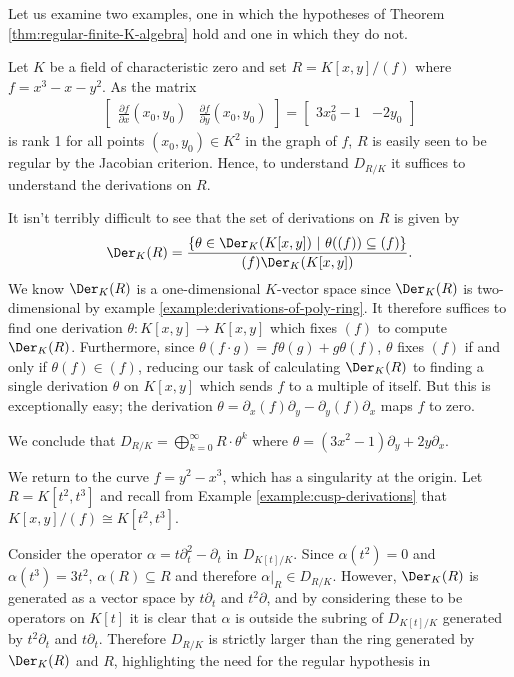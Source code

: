 Let us examine two examples, one in which the hypotheses of Theorem \ref{thm:regular-finite-K-algebra} hold and one in which they do not.
\begin{example}\label{example:elliptic-curve}
	Let $K$ be a field of characteristic zero and set $R = K[x,y]/(f)$ where $f = x^3 - x - y^2$. As the matrix
	\begin{align*}
		\begin{bmatrix}
			\frac{\partial f}{\partial x}(x_0,y_0) & \frac{\partial f}{\partial y}(x_0, y_0)
		\end{bmatrix}
		=
		\begin{bmatrix}
			3x_0^2 - 1 & -2y_0
		\end{bmatrix}
	\end{align*}
	is rank 1 for all points $(x_0,y_0)\in K^2$ in the graph of $f$, $R$ is easily seen to be regular by the Jacobian criterion. Hence, to understand $D_{R/K}$ it suffices to understand the derivations on $R$.

	It isn't terribly difficult to see that the set of derivations on $R$ is given by
	\begin{align*}
		\Der_K(R) = \frac{\{\theta \in \Der_K(K[x,y])~|~ \theta((f)) \subseteq (f)\}}{(f)\Der_K(K[x,y])}.
	\end{align*}
	We know $\Der_K(R)$ is a one-dimensional $K$-vector space since $\Der_K(R)$ is two-dimensional by example \ref{example:derivations-of-poly-ring}. It therefore suffices to find one derivation $\theta:K[x,y] \to K[x,y]$ which fixes $(f)$ to compute $\Der_K(R)$. Furthermore, since $\theta(f\cdot g) = f\theta(g) + g\theta(f)$, $\theta$ fixes $(f)$ if and only if $\theta(f) \in (f)$, reducing our task of calculating $\Der_K(R)$ to finding a single derivation $\theta$ on $K[x,y]$ which sends $f$ to a multiple of itself. But this is exceptionally easy; the derivation $\theta = \partial_x(f)\partial_y - \partial_y(f)\partial_x$ maps $f$ to zero.

	We conclude that $D_{R/K} = \bigoplus_{k=0}^\infty R\cdot \theta^k$ where $\theta = (3x^2 - 1)\partial_y + 2y\partial_x$.
\end{example}
\begin{example}\label{example:cubic-not-well-behaved}
	We return to the curve $f = y^2 - x^3$, which has a singularity at the origin. Let $R = K[t^2,t^3]$ and recall from Example \ref{example:cusp-derivations} that $K[x,y]/(f) \cong K[t^2,t^3]$. 

	Consider the operator $\alpha = t\partial_t^2 - \partial_t$ in $D_{K[t]/K}$. Since $\alpha(t^2) = 0$ and $\alpha(t^3) = 3t^2$, $\alpha(R) \subseteq R$ and therefore $\alpha|_{R} \in D_{R/K}$. However, $\Der_K(R)$ is generated as a vector space by $t\partial_t$ and $t^2\partial$, and by considering these to be operators on $K[t]$ it is clear that $\alpha$ is outside the subring of $D_{K[t]/K}$ generated by $t^2\partial_t$ and $t\partial_t$. Therefore $D_{R/K}$ is strictly larger than the ring generated by $\Der_K(R)$ and $R$, highlighting the need for the regular hypothesis in 
\end{example}
